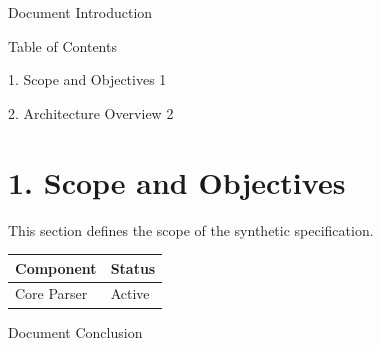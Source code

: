 \documentclass[11pt,a4paper]{article}
\begin{document}
Document Introduction

Table of Contents

1. Scope and Objectives	1

2. Architecture Overview	2

\section{1. Scope and Objectives}

This section defines the scope of the synthetic specification.

\begin{table}[h]
\begin{tabular}{|l|l|}
\hline
Component & Status \\ \hline
Core Parser & Active \\ \hline
\end{tabular}
\end{table}

Document Conclusion
\end{document}
